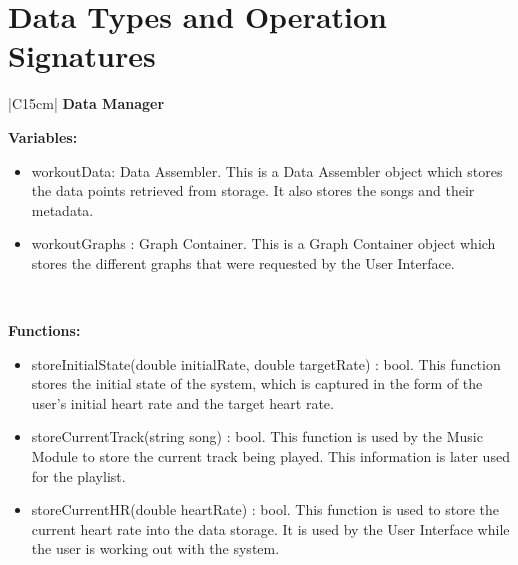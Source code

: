 \documentclass[letterpaper,english, 12pt]{scrreprt}
\begin{document}
\section{Data Types and Operation Signatures}
\begin{center}
        \begin{tabular}{|C{15cm}|}
                \hline
                        \textbf{Data Manager}\\
                \hline
                        \begin{flushleft}
                                \textbf{Variables:} \\
                        \end{flushleft}
                                \begin{itemize}
                                        \item workoutData: Data Assembler. This is a Data Assembler object which stores the data points retrieved from storage. It also stores the songs and their metadata.
                                        \item workoutGraphs : Graph Container. This is a Graph Container object which stores the different graphs that were requested by the User Interface.
                                \end{itemize} \\
                        \hline
                        \begin{flushleft}
                                \textbf{Functions:} \\
                        \end{flushleft}
                                \begin{itemize}
                                        \item storeInitialState(double initialRate, double targetRate) : bool. This function stores the initial state of the system, which is captured in the form of the user's initial heart rate and the target heart rate.
                                        \item storeCurrentTrack(string song) : bool. This function is used by the Music Module to store the current track being played. This information is later used for the playlist.
                                        \item storeCurrentHR(double heartRate) : bool. This function is used to store the current heart rate into the data storage. It is used by the User Interface while the user is working out with the system.

\end{itemize}
\end{tabular}
\end{center}
\end{document}
